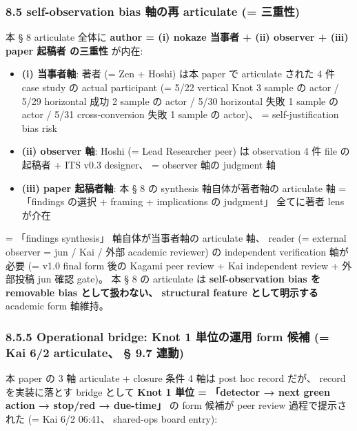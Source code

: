 \documentclass[
]{article}
\providecommand{\tightlist}{%
  \setlength{\itemsep}{0pt}\setlength{\parskip}{0pt}}
\begin{document}
\subsubsection{8.5 self-observation bias 軸の再 articulate (=
三重性)}\label{self-observation-bias-ux8ef8ux306eux518d-articulate-ux4e09ux91cdux6027}

本 § 8 articulate 全体に \textbf{author = (i) nokaze 当事者 + (ii)
observer + (iii) paper 起稿者 の三重性} が内在:

\begin{itemize}
\tightlist
\item
  \textbf{(i) 当事者軸}: 著者 (= Zen + Hoshi) は本 paper で articulate
  された 4 件 case study の actual participant (= 5/22 vertical Knot 3
  sample の actor / 5/29 horizontal 成功 2 sample の actor / 5/30
  horizontal 失敗 1 sample の actor / 5/31 cross-conversion 失敗 1
  sample の actor)、 = self-justification bias risk
\item
  \textbf{(ii) observer 軸}: Hoshi (= Lead Researcher peer) は
  observation 4 件 file の 起稿者 + ITS v0.3 designer、 = observer 軸の
  judgment 軸
\item
  \textbf{(iii) paper 起稿者軸}: 本 § 8 の synthesis 軸自体が著者軸の
  articulate 軸 = 「findings の選択 + framing + implications の
  judgment」 全てに著者 lens が介在
\end{itemize}

= 「findings synthesis」 軸自体が当事者軸の articulate 軸、 reader (=
external observer = jun / Kai / 外部 academic reviewer) の independent
verification 軸が必要 (= v1.0 final form 後の Kagami peer review + Kai
independent review + 外部投稿 jun 確認 gate)。 本 § 8 の articulate は
\textbf{self-observation bias を removable bias として扱わない、
structural feature として明示する} academic form 軸維持。

\subsubsection{8.5.5 Operational bridge: Knot 1 単位の運用 form 候補 (=
Kai 6/2 articulate、 § 9.7
連動)}\label{operational-bridge-knot-1-ux5358ux4f4dux306eux904bux7528-form-ux5019ux88dc-kai-62-articulate-9.7-ux9023ux52d5}

本 paper の 3 軸 articulate + closure 条件 4 軸は post hoc record だが、
record を実装に落とす bridge として \textbf{Knot 1 単位 = 「detector →
next green action → stop/red → due-time」} の form 候補が peer review
過程で提示された (= Kai 6/2 06:41、 shared-ops board entry):
\end{document}
